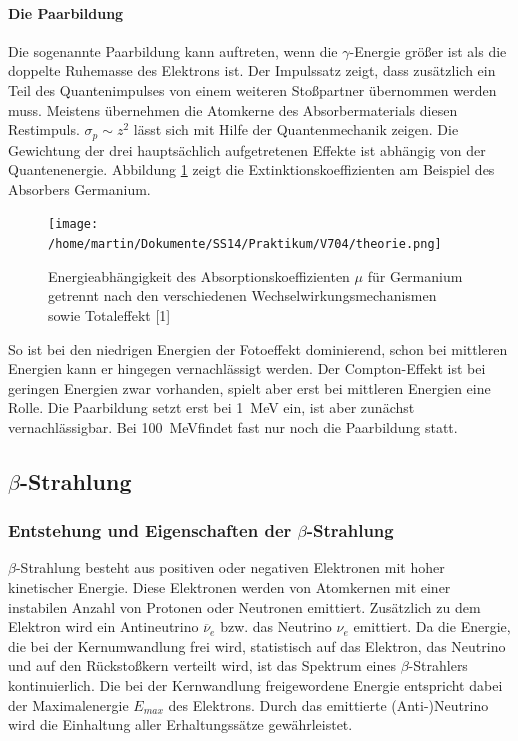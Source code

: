 \documentclass[11pt,ngerman,a4paper]{article}
\begin{document}
\paragraph{Die Paarbildung}
Die sogenannte Paarbildung kann auftreten, wenn die $\gamma$-Energie größer ist als die doppelte Ruhemasse des Elektrons ist.
Der Impulssatz zeigt, dass zusätzlich ein Teil des Quantenimpulses von einem weiteren Stoßpartner übernommen werden muss. Meistens übernehmen die Atomkerne des Absorbermaterials diesen Restimpuls. $\sigma_p \sim z^2$ lässt sich mit Hilfe der Quantenmechanik zeigen.
\newline\newline
Die Gewichtung der drei hauptsächlich aufgetretenen Effekte ist abhängig von der Quantenenergie. Abbildung \ref{a1} zeigt die Extinktionskoeffizienten am Beispiel des Absorbers Germanium. 
\begin{figure}[h!]
\centering
\texttt{[image: /home/martin/Dokumente/SS14/Praktikum/V704/theorie.png]}
\caption{Energieabhängigkeit des Absorptionskoeffizienten $\mu$ für Germanium getrennt nach den verschiedenen Wechselwirkungsmechanismen sowie Totaleffekt [1]}
\label{a1}
\end{figure}
So ist bei den niedrigen Energien der Fotoeffekt dominierend, schon bei mittleren Energien kann er hingegen vernachlässigt werden. Der Compton-Effekt ist bei geringen Energien zwar vorhanden, spielt aber erst bei mittleren Energien eine Rolle. Die Paarbildung setzt erst bei \SI{1}{MeV} ein, ist aber zunächst vernachlässigbar. Bei \SI{100}{MeV}findet fast nur noch die Paarbildung statt.
\subsection{$\beta$-Strahlung}
\subsubsection{Entstehung und Eigenschaften der $\beta$-Strahlung}
$\beta$-Strahlung besteht aus positiven oder negativen Elektronen mit hoher kinetischer Energie. Diese Elektronen werden von Atomkernen mit einer instabilen Anzahl von Protonen oder Neutronen emittiert. Zusätzlich zu dem Elektron wird ein Antineutrino $\overline{\nu}_e$ bzw. das Neutrino $\nu_e$ emittiert. Da die Energie, die bei der Kernumwandlung frei wird, statistisch auf das Elektron, das Neutrino und auf den Rückstoßkern verteilt wird, ist das Spektrum eines $\beta$-Strahlers kontinuierlich. Die bei der Kernwandlung freigewordene Energie entspricht dabei der Maximalenergie $E_{max}$ des Elektrons. Durch das emittierte (Anti-)Neutrino wird die Einhaltung aller Erhaltungssätze gewährleistet.
\end{document}
